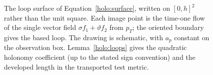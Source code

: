 \begin{figure}[!htbp]
\caption{The loop surface of Equation~\eqref{holo:surface}, written on
$[0,h]^2$ rather than the unit square. Each image point is the time-one
flow of the single vector field $\sigma f_1+\vartheta f_2$ from $p_T$;
the oriented boundary gives the based loop. The drawing is schematic,
with $a_p$ constant on the observation box. Lemma~\ref{holo:loops}
gives the quadratic holonomy coefficient (up to the stated sign
convention) and the developed length in the transported test metric.}
\label{fig:parameter-flow-loop}
\end{figure}

